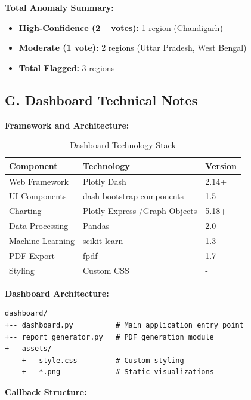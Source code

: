 \documentclass[11pt, a4paper]{article}
\begin{document}
\textbf{Total Anomaly Summary:}


\begin{itemize}
\item \textbf{High-Confidence (2+ votes):} 1 region (Chandigarh)

\item \textbf{Moderate (1 vote):} 2 regions (Uttar Pradesh, West Bengal)

\item \textbf{Total Flagged:} 3 regions
\end{itemize}

\subsection{G. Dashboard Technical Notes}

\textbf{Framework and Architecture:}


\vspace{0.8em}
\begin{table}[H]
\caption{Dashboard Technology Stack}
{\small
\begin{tabularx}{\textwidth}{|Y|Y|Y|}
\hline
\textbf{Component} & \textbf{Technology} & \textbf{Version} \\ \hline
Web Framework & Plotly Dash & 2.14+ \\ \hline
UI Components & dash-bootstrap-components & 1.5+ \\ \hline
Charting & Plotly Express /\allowbreak  Graph Objects & 5.18+ \\ \hline
Data Processing & Pandas & 2.0+ \\ \hline
Machine Learning & scikit-learn & 1.3+ \\ \hline
PDF Export & fpdf & 1.7+ \\ \hline
Styling & Custom CSS & - \\ \hline
\end{tabularx}
}
\end{table}
\vspace{1em}

\textbf{Dashboard Architecture:}


\begin{lstlisting}
dashboard/
+-- dashboard.py          # Main application entry point
+-- report_generator.py   # PDF generation module
+-- assets/
    +-- style.css         # Custom styling
    +-- *.png             # Static visualizations
\end{lstlisting}

\textbf{Callback Structure:}
\end{document}
